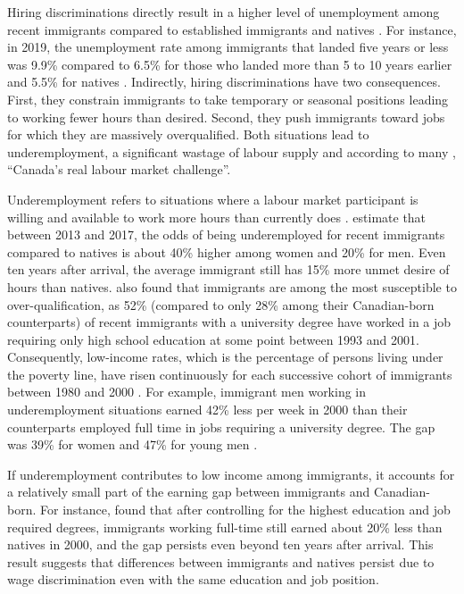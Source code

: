 \vspace{0.7em}\par
Hiring discriminations directly result in a higher level of unemployment among recent immigrants compared to established immigrants and natives \citep{Oreopoulos:2011jv}.
For instance, in 2019, the unemployment rate among immigrants that landed five years or less was 9.9\% compared to 6.5\% for those who landed more than 5 to 10 years earlier and 5.5\% for natives \citep{statCan:002}.
Indirectly, hiring discriminations have two consequences.
First, they constrain immigrants to take temporary or seasonal positions leading to working fewer hours than desired.
Second, they push immigrants toward jobs for which they are massively overqualified.
Both situations lead to underemployment, a significant wastage of labour supply \citep{Mitchell:2008wo} and according to many \citep{CanadianLabourCongress:2014wi,Li:2006uu}, ``Canada's real labour market challenge''.

\vspace{0.7em}\par
Underemployment refers to situations where a labour market participant is willing and available to work more hours than currently does \citep{ilo:2013icls,gilbert:2020b}.
\citet{gilbert:2020b} estimate that between 2013 and 2017, the odds of being underemployed for recent immigrants compared to natives is about 40\% higher among women and 20\% for men.
Even ten years after arrival, the average immigrant still has 15\% more unmet desire of hours than natives.
\citet{Li:2006uu} also found that immigrants are among the most susceptible to over-qualification, as 52\% (compared to only 28\% among their Canadian-born counterparts) of recent immigrants with a university degree have worked in a job requiring only high school education at some point between 1993 and 2001.
Consequently, low-income rates, which is the percentage of persons living under the poverty line, have risen continuously for each successive cohort of immigrants between 1980 and 2000  \citep{picot2003rise}.
For example, immigrant men working in underemployment situations earned 42\% less per week in 2000 than their counterparts employed full time in jobs requiring a university degree.
The gap was 39\% for women and 47\% for young men \citep{Morissette:wh}.

\vspace{0.7em}\par
If underemployment contributes to low income among immigrants, it accounts for a relatively small part of the earning gap between immigrants and Canadian-born.
For instance, \citet{Morissette:wh} found that after controlling for the highest education and job required degrees, immigrants working full-time still earned about 20\% less than natives in 2000, and the gap persists even beyond ten years after arrival.
This result suggests that differences between immigrants and natives persist due to wage discrimination even with the same education and job position.

